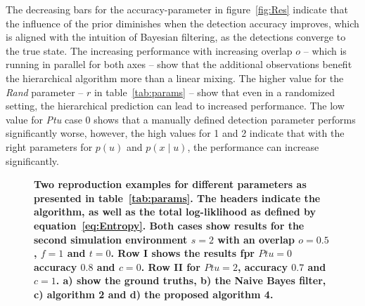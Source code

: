 \documentclass[twocolumn,letterpaper]{IEEEAerospaceCLS}  %
\begin{document}
The decreasing bars for the accuracy-parameter in figure~\ref{fig:Res} indicate that the influence of the prior diminishes when the detection accuracy improves, which is aligned with the intuition of Bayesian filtering, as the detections converge to the true state. The increasing performance with increasing overlap $o$ -- which is running in parallel for both axes -- show that the additional observations benefit the hierarchical algorithm more than a linear mixing. The higher value for the \emph{Rand} parameter -- $r$ in table~\ref{tab:params} -- show that even in a randomized setting, the hierarchical prediction can lead to increased performance. The low value for \emph{Ptu} case 0 shows that a manually defined detection parameter performs significantly worse, however, the high values for 1 and 2 indicate that with the right parameters for $p(u)$ and $p(x\mid u)$, the performance can increase significantly.
\begin{figure}
    \centering
    \caption{\bf{
        Two reproduction examples for different parameters as presented in table~\ref{tab:params}. The headers indicate the algorithm, as well as the total log-liklihood as defined by equation~\ref{eq:Entropy}. Both cases show results for the second simulation environment $s=2$ with an overlap $o=0.5$, $f=1$ and $t=0$. Row I shows the results fpr $Ptu=0$ accuracy $0.8$ and $c=0$. Row II for $Ptu=2$, accuracy $0.7$ and $c=1$. a) show the ground truths, b) the Naive Bayes filter, c) algorithm 2 and d) the proposed algorithm 4. 
    }}
    \label{fig:SampRes}
\end{figure}
\end{document}
